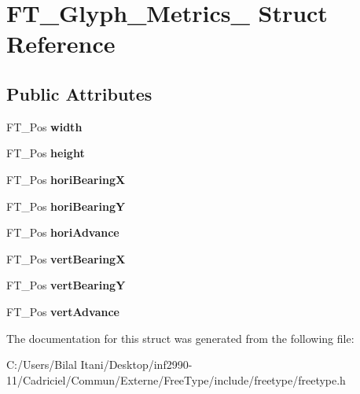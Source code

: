 \hypertarget{struct_f_t___glyph___metrics__}{}\section{F\+T\+\_\+\+Glyph\+\_\+\+Metrics\+\_\+ Struct Reference}
\label{struct_f_t___glyph___metrics__}
\subsection*{Public Attributes}
\begin{DoxyCompactItemize}
\item 
F\+T\+\_\+\+Pos {\bfseries width}\hypertarget{struct_f_t___glyph___metrics___a0ff1be869e6a28d1f2990b0e5719dca9}{}\label{struct_f_t___glyph___metrics___a0ff1be869e6a28d1f2990b0e5719dca9}

\item 
F\+T\+\_\+\+Pos {\bfseries height}\hypertarget{struct_f_t___glyph___metrics___aa2a76ec448ec9d18acf343f01b77cb21}{}\label{struct_f_t___glyph___metrics___aa2a76ec448ec9d18acf343f01b77cb21}

\item 
F\+T\+\_\+\+Pos {\bfseries hori\+BearingX}\hypertarget{struct_f_t___glyph___metrics___a2afc877f52c8a8910ec144a1948186cc}{}\label{struct_f_t___glyph___metrics___a2afc877f52c8a8910ec144a1948186cc}

\item 
F\+T\+\_\+\+Pos {\bfseries hori\+BearingY}\hypertarget{struct_f_t___glyph___metrics___afd97c10d43ed1f66598a18884468b536}{}\label{struct_f_t___glyph___metrics___afd97c10d43ed1f66598a18884468b536}

\item 
F\+T\+\_\+\+Pos {\bfseries hori\+Advance}\hypertarget{struct_f_t___glyph___metrics___af12db260a90b8a7c938ad48ebf20ccbe}{}\label{struct_f_t___glyph___metrics___af12db260a90b8a7c938ad48ebf20ccbe}

\item 
F\+T\+\_\+\+Pos {\bfseries vert\+BearingX}\hypertarget{struct_f_t___glyph___metrics___aead5c5637b983b811738bff3bcea8cea}{}\label{struct_f_t___glyph___metrics___aead5c5637b983b811738bff3bcea8cea}

\item 
F\+T\+\_\+\+Pos {\bfseries vert\+BearingY}\hypertarget{struct_f_t___glyph___metrics___a7f1aba91b86fddeb11030eab15dcce08}{}\label{struct_f_t___glyph___metrics___a7f1aba91b86fddeb11030eab15dcce08}

\item 
F\+T\+\_\+\+Pos {\bfseries vert\+Advance}\hypertarget{struct_f_t___glyph___metrics___a594f43c64fe5c12a399a0f0a47c04990}{}\label{struct_f_t___glyph___metrics___a594f43c64fe5c12a399a0f0a47c04990}

\end{DoxyCompactItemize}


The documentation for this struct was generated from the following file\+:\begin{DoxyCompactItemize}
\item 
C\+:/\+Users/\+Bilal Itani/\+Desktop/inf2990-\/11/\+Cadriciel/\+Commun/\+Externe/\+Free\+Type/include/freetype/freetype.\+h\end{DoxyCompactItemize}
